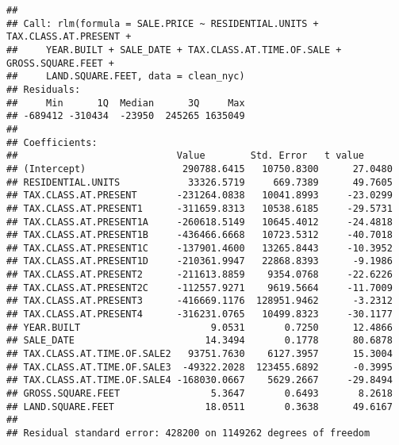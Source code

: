 \documentclass[
]{article}
\begin{document}
\begin{verbatim}
## 
## Call: rlm(formula = SALE.PRICE ~ RESIDENTIAL.UNITS + TAX.CLASS.AT.PRESENT + 
##     YEAR.BUILT + SALE_DATE + TAX.CLASS.AT.TIME.OF.SALE + GROSS.SQUARE.FEET + 
##     LAND.SQUARE.FEET, data = clean_nyc)
## Residuals:
##     Min      1Q  Median      3Q     Max 
## -689412 -310434  -23950  245265 1635049 
## 
## Coefficients:
##                            Value        Std. Error   t value     
## (Intercept)                 290788.6415   10750.8300      27.0480
## RESIDENTIAL.UNITS            33326.5719     669.7389      49.7605
## TAX.CLASS.AT.PRESENT       -231264.0838   10041.8993     -23.0299
## TAX.CLASS.AT.PRESENT1      -311659.8313   10538.6185     -29.5731
## TAX.CLASS.AT.PRESENT1A     -260618.5149   10645.4012     -24.4818
## TAX.CLASS.AT.PRESENT1B     -436466.6668   10723.5312     -40.7018
## TAX.CLASS.AT.PRESENT1C     -137901.4600   13265.8443     -10.3952
## TAX.CLASS.AT.PRESENT1D     -210361.9947   22868.8393      -9.1986
## TAX.CLASS.AT.PRESENT2      -211613.8859    9354.0768     -22.6226
## TAX.CLASS.AT.PRESENT2C     -112557.9271    9619.5664     -11.7009
## TAX.CLASS.AT.PRESENT3      -416669.1176  128951.9462      -3.2312
## TAX.CLASS.AT.PRESENT4      -316231.0765   10499.8323     -30.1177
## YEAR.BUILT                       9.0531       0.7250      12.4866
## SALE_DATE                       14.3494       0.1778      80.6878
## TAX.CLASS.AT.TIME.OF.SALE2   93751.7630    6127.3957      15.3004
## TAX.CLASS.AT.TIME.OF.SALE3  -49322.2028  123455.6892      -0.3995
## TAX.CLASS.AT.TIME.OF.SALE4 -168030.0667    5629.2667     -29.8494
## GROSS.SQUARE.FEET                5.3647       0.6493       8.2618
## LAND.SQUARE.FEET                18.0511       0.3638      49.6167
## 
## Residual standard error: 428200 on 1149262 degrees of freedom
\end{verbatim}
\end{document}
